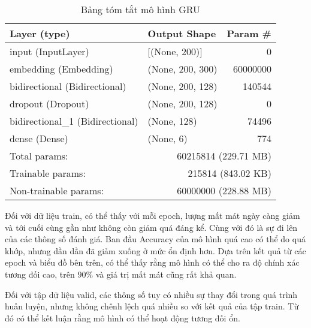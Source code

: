 \begin{table}[htb]
    \centering
    \caption{Bảng tóm tắt mô hình GRU}\label{table:gru-model}
    \begin{tabular}{l l r}
        \toprule
        \textbf{Layer (type)}            & \textbf{Output Shape}                    & \textbf{Param \#} \\\midrule
        input (InputLayer)               & [(None, 200)]                            & 0                 \\
        embedding (Embedding)            & (None, 200, 300)                         & 60000000          \\
        bidirectional (Bidirectional)    & (None, 200, 128)                         & 140544            \\
        dropout (Dropout)                & (None, 200, 128)                         & 0                 \\
        bidirectional\_1 (Bidirectional) & (None, 128)                              & 74496             \\
        dense (Dense)                    & (None, 6)                                & 774               \\\midrule
        Total params:                    & \multicolumn{2}{r}{60215814 (229.71 MB)}                     \\
        Trainable params:                & \multicolumn{2}{r}{215814 (843.02 KB)}                       \\
        Non-trainable params:            & \multicolumn{2}{r}{60000000 (228.88 MB)}                     \\
        \bottomrule
    \end{tabular}
\end{table}

Đối với dữ liệu train, có thể thấy với mỗi epoch, lượng mất mát ngày càng giảm và tới cuối cùng gần như không còn giảm quá đáng kể. Cùng với đó là sự đi lên của các thông số đánh giá. Ban đầu Accuracy của mô hình quá cao có thể do quá khớp, nhưng dần dần đã giảm xuống ở mức ổn định hơn. Dựa trên kết quả từ các epoch và biểu đồ bên trên, có thể thấy rằng mô hình có thể cho ra độ chính xác tương đối cao, trên $90\%$ và giá trị mất mát cũng rất khả quan.

Đối với tập dữ liệu valid, các thông số tuy có nhiều sự thay đổi trong quá trình huấn
luyện, nhưng không chênh lệch quá nhiều so với kết quả của tập train. Từ đó có thể kết
luận rằng mô hình có thể hoạt động tương đối ổn.

